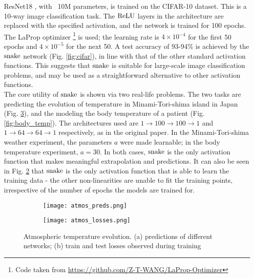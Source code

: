 ResNet18 \cite{7780459}, with ~10M parameters, is trained on the CIFAR-10 dataset. This is a 10-way image classification task. The $ \operatorname{ReLU} $ layers in the architecture are replaced with the specified activation, and the network is trained for 100 epochs. The \rm{LaProp} optimizer \footnote{Code taken from \url{https://github.com/Z-T-WANG/LaProp-Optimizer}} \cite{ziyin2020laprop} is used; the learning rate is $4 \times 10^{-4}$ for the first 50 epochs and $4 \times 10^{-5}$ for the next 50. A test accuracy of 93-94\% is achieved by the $ \operatorname{snake} $ network (Fig. \ref{fig:cifar}), in line with that of the other standard activation functions. This suggests that $ \operatorname{snake} $ is suitable for large-scale image classification problems, and may be used as a straightforward alternative to other activation functions. \\


The core utility of $ \operatorname{snake} $ is shown via two real-life problems. The two tasks are predicting the evolution of temperature in Minami-Tori-shima island in Japan (Fig. \ref{fig:atm}), and the modeling the body temperature of a patient (Fig. \ref{fig:body_temp}). The architectures used are $1\rightarrow100 \rightarrow 100 \rightarrow 1$ and $1 \rightarrow 64 \rightarrow 64 \rightarrow 1$ respectively, as in the original paper. In the Minami-Tori-shima weather experiment, the parameters $a$ were made learnable; in the body temperature experiment, $a = 30$. In both cases, $ \operatorname{snake} $ is the only activation function that makes meaningful extrapolation and predictions. It can also be seen in Fig. \ref{fig:subim2} that $ \operatorname{snake} $ is the only activation function that is able to learn the training data - the other non-linearities are unable to fit the training points, irrespective of the number of epochs the models are trained for. \\


\begin{figure}[h]
  \centering
  \begin{subfigure}{0.45\textwidth}
    \texttt{[image: atmos\_preds.png]}
  \caption{}
  \label{fig:subim1}
  \end{subfigure}
  \begin{subfigure}{0.45\textwidth}
    \texttt{[image: atmos\_losses.png]}
  \caption{}
  \label{fig:subim2}
  \end{subfigure}

  \caption{Atmospheric temperature evolution. (a) predictions of different networks; (b) train and test losses observed during training}
  \label{fig:atm}
\end{figure}

